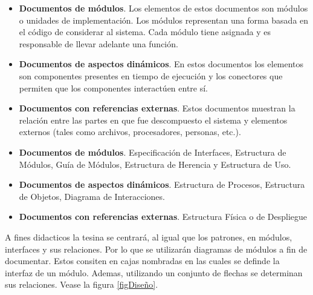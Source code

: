 \begin{itemize}
\item \textbf{Documentos de módulos}. Los elementos de estos documentos son módulos o unidades de implementación. Los módulos representan una forma basada en el código de considerar al sistema. Cada módulo tiene asignada y es responsable de llevar adelante una función.
\item \textbf{Documentos de aspectos dinámicos}. En estos documentos los elementos son componentes presentes en tiempo de ejecución y los conectores que permiten que los componentes interactúen entre sí.
\item \textbf{Documentos con referencias externas}. Estos documentos muestran la relación entre las partes en que fue descompuesto el sistema y elementos externos (tales como archivos, procesadores, personas, etc.).
\item \textbf{Documentos de módulos}. Especificación de Interfaces, Estructura de Módulos, Guía de Módulos, Estructura de Herencia y Estructura de Uso.
\item \textbf{Documentos de aspectos dinámicos}. Estructura de Procesos, Estructura de Objetos, Diagrama
de Interacciones.
\item \textbf{Documentos con referencias externas}. Estructura Física o de Despliegue
\end{itemize}

A fines didacticos la tesina se centrará, al igual que los patrones, en módulos, interfaces y sus relaciones. Por lo que se utilizarán diagramas de módulos a fin de documentar. Estos consiten en cajas nombradas en las cuales se definde la interfaz de un módulo. Ademas, utilizando un conjunto de flechas se determinan sus relaciones. Vease la figura \ref{figDiseño}.



